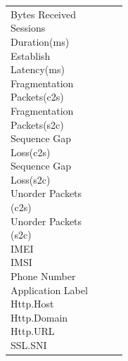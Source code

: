 \begin{description}
\begin{longtable}{p{}|p{}|p{}|p{}}
{                                                                            Bytes Received\\
                                                                            Sessions\\
                                                                            Duration(ms)\\
                                                                            Establish\\ Latency(ms)\\
                                                                            Fragmentation\\ Packets(c2s)\\
                                                                            Fragmentation\\ Packets(s2c)\\
                                                                            Sequence Gap\\ Loss(c2s)\\
                                                                            Sequence Gap\\ Loss(s2c)\\
                                                                            Unorder Packets\\(c2s)\\
                                                                            Unorder Packets\\(s2c)\\
                                                                            IMEI\\
                                                                            IMSI\\
                                                                            Phone Number\\
                                                                            Application Label\\
                                                                            Http.Host\\
                                                                            Http.Domain\\
                                                                            Http.URL\\
                                                                            SSL.SNI\\
}
\end{longtable}
\end{description}
